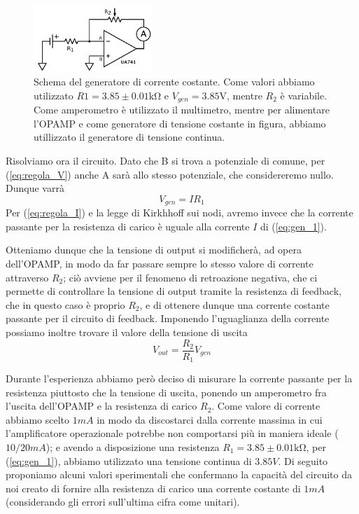 \begin{figure}
  \begin{center}
    \includegraphics[width=0.40\textwidth]{../E01/latex/c1.pdf}
  \end{center}
  \caption{Schema del generatore di corrente costante. Come valori abbiamo utilizzato $R1=3.85 \pm 0.01 \si{\kilo\ohm}$ e $V_{gen}=3.85 \si{\volt}$, mentre $R_2$ è variabile. Come amperometro è utilizzato il multimetro, mentre per alimentare l'OPAMP e come generatore di tensione costante in figura, abbiamo utillizzato il generatore di tensione continua.}
\end{figure}

Risolviamo ora il circuito. Dato che B si trova a potenziale di comune, per (\ref{eq:regola_V}) anche A sarà allo stesso potenziale, che considereremo nullo. Dunque varrà
\begin{equation}
V_{gen}=I R_1
\label{eq:gen_1}
\end{equation}
Per (\ref{eq:regola_I}) e la legge di Kirkhhoff sui nodi, avremo invece che la corrente passante per la resistenza di carico è uguale alla corrente $I$ di (\ref{eq:gen_1}).

Otteniamo dunque che la tensione di output si modificherà, ad opera dell'OPAMP, in modo da far passare sempre lo stesso valore di corrente attraverso $R_2$; ciò avviene per il fenomeno di retroazione negativa, che ci permette di controllare la tensione di output tramite la resistenza di feedback, che in questo caso è proprio $R_2$, e di ottenere dunque una corrente costante passante per il circuito di feedback. Imponendo l'uguaglianza della corrente possiamo inoltre trovare il valore della tensione di uscita
$$V_{out}=\frac{R_2}{R_1} V_{gen}$$

Durante l'esperienza abbiamo però deciso di misurare la corrente passante per la resistenza piuttosto che la tensione di uscita, ponendo un amperometro fra l'uscita dell'OPAMP e la resistenza di carico $R_2$. Come valore di corrente abbiamo scelto $1 mA$ in modo da discostarci dalla corrente massima in cui l'amplificatore operazionale potrebbe non comportarsi più in maniera ideale ($10/20 mA$); e avendo a disposizione una resistenza $R_1=3.85 \pm 0.01 \si{\kilo\ohm}$, per (\ref{eq:gen_1}), abbiamo utilizzato una tensione continua di $3.85 V$. Di seguito proponiamo alcuni valori sperimentali che confermano la capacità del circuito da noi creato di fornire alla resistenza di carico una corrente costante di $1 mA$ (considerando gli errori sull'ultima cifra come unitari).

